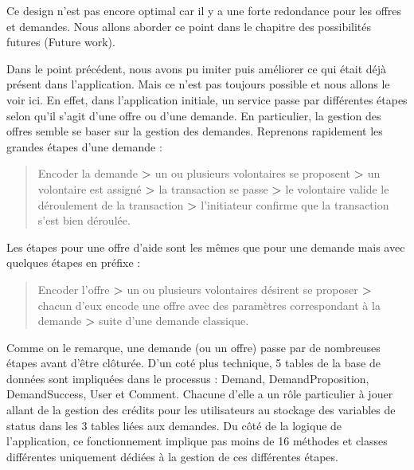 {\begin{description}
Ce design n'est pas encore optimal car il y a une forte redondance pour les offres et demandes.  Nous allons aborder ce point dans le chapitre des possibilités futures (Future work).


\item[Les offres/demandes]
Dans le point précédent,  nous avons pu imiter puis améliorer ce qui était déjà présent dans l'application.  Mais ce n'est pas toujours possible et nous allons le voir ici.  En effet,  dans l'application initiale,  un service passe par différentes étapes selon qu'il s'agit d'une offre ou d'une demande.  En particulier,  la gestion des offres semble se baser sur la gestion des demandes.  Reprenons rapidement les grandes étapes d'une demande : \\

\begin{framed} \begin{quote}
Encoder la demande \textbf{>} un ou plusieurs volontaires se proposent \textbf{>} un volontaire est assigné \textbf{>} la transaction se passe \textbf{>} le volontaire valide le déroulement de la transaction \textbf{>} l'initiateur confirme que la transaction s'est bien déroulée.
 \end{quote} \end{framed}

Les étapes pour une offre d'aide sont les mêmes que pour une demande mais avec quelques étapes en préfixe : 

\begin{framed} \begin{quote}
Encoder l'offre \textbf{>} un ou plusieurs volontaires désirent se proposer \textbf{>} chacun d'eux encode une offre avec des paramètres correspondant à la demande \textbf{>} suite d'une demande classique.
 \end{quote} \end{framed}

Comme on le remarque,  une demande (ou un offre) passe par de nombreuses étapes avant d'être clôturée.  D'un coté plus technique,  5 tables de la base de données sont impliquées dans le processus : Demand,  DemandProposition,  DemandSuccess,  User et Comment.  Chacune d'elle a un rôle particulier à jouer allant de la gestion des crédits pour les utilisateurs au stockage des variables de status dans les 3 tables liées aux demandes.  Du côté de la logique de l'application,  ce fonctionnement implique pas moins de 16 méthodes et classes différentes uniquement dédiées à la gestion de ces différentes étapes.  


\end{description}}
